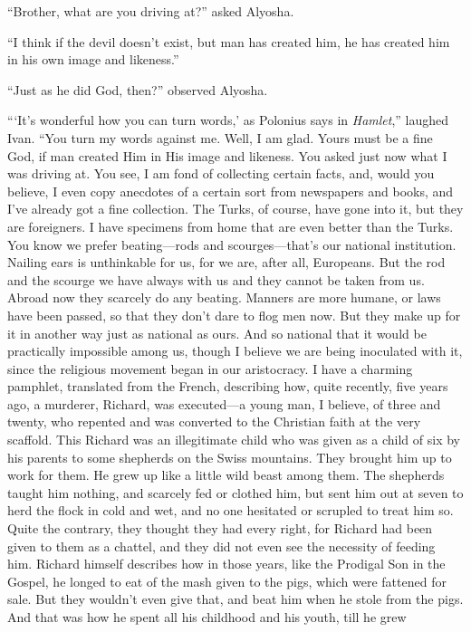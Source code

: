 ``Brother, what are you driving at?'' asked Alyosha.

``I think if the devil doesn't exist, but man has created him, he has
created him in his own image and likeness.''

``Just as he did God, then?'' observed Alyosha.

```It's wonderful how you can turn words,' as Polonius says in
\textit{Hamlet},'' laughed Ivan. ``You turn my words against me. Well,
I am glad. Yours must be a fine God, if man created Him in His image
and likeness. You asked just now what I was driving at. You see, I am
fond of collecting certain facts, and, would you believe, I even copy
anecdotes of a certain sort from newspapers and books, and I've
already got a fine collection. The Turks, of course, have gone into
it, but they are foreigners. I have specimens from home that are even
better than the Turks. You know we prefer beat\-ing---rods and
scour\-ges---that's our national institution. Nailing ears is
unthinkable for us, for we are, after all, Europeans. But the rod and
the scourge we have always with us and they cannot be taken from us.
Abroad now they scarcely do any beating. Manners are more humane, or
laws have been passed, so that they don't dare to flog men now. But
they make up for it in another way just as national as ours. And so
national that it would be practically impossible among us, though I
believe we are being inoculated with it, since the religious movement
began in our aristocracy. I have a charming pamphlet, translated from
the French, describing how, quite recently, five years ago, a
murderer, Richard, was ex\-e\-cut\-ed---a young man, I believe, of
three and twenty, who repented and was  converted to the
Christian faith at the very scaffold. This Richard was an illegitimate
child who was given as a child of six by his parents to some shepherds
on the Swiss mountains. They brought him up to work for them. He
grew up like a little wild beast among them. The shepherds taught him
nothing, and scarcely fed or clothed him, but sent him out at seven to
herd the flock in cold and wet, and no one hesitated or scrupled to
treat him so. Quite the contrary, they thought they had every right,
for Richard had been given to them as a chattel, and they did not even
see the necessity of feeding him. Richard himself describes how in
those years, like the Prodigal Son in the Gospel, he longed to eat
of the mash given to the pigs, which were fattened for sale. But they
wouldn't even give that, and beat him when he stole from the pigs. And
that was how he spent all his childhood and his youth, till he grew
